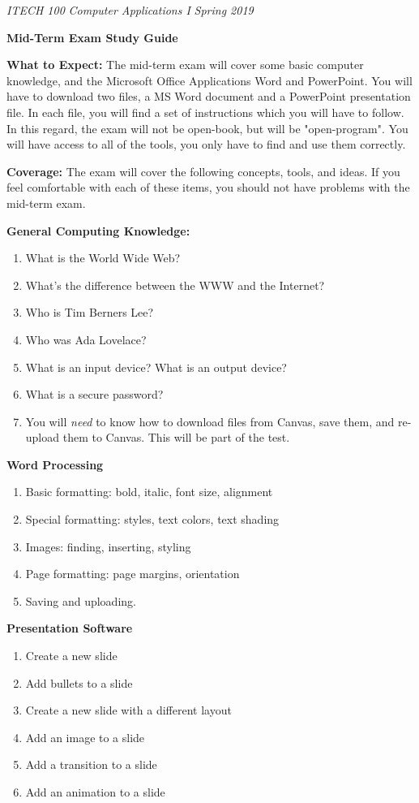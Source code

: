 \documentclass[a4paper, 11pt]{article}
\begin{document}
\noindent
\textit{ITECH 100} \hfill \textit{Computer Applications I} \hfill \textit{Spring 2019}
\begin{center}
\large\textbf{Mid-Term Exam Study Guide}
\end{center}

\large\textbf{What to Expect:}
The mid-term exam will cover some basic computer knowledge, and the Microsoft Office Applications Word and PowerPoint. You will have to download two files, a MS Word document and a PowerPoint presentation file. In each file, you will find a set of instructions which you will have to follow. In this regard, the exam will not be open-book, but will be "open-program". You will have access to all of the tools, you only have to find and use them correctly.

\large\textbf{Coverage:}
The exam will cover the following concepts, tools, and ideas. If you feel comfortable with each of these items, you should not have problems with the mid-term exam.

\large\textbf{General Computing Knowledge:}
\begin{enumerate}[noitemsep]
    \item What is the World Wide Web?
    \item What's the difference between the WWW and the Internet?
    \item Who is Tim Berners Lee?
    \item Who was Ada Lovelace?
    \item What is an input device? What is an output device?
    \item What is a secure password?
    \item You will \textit{need} to know how to download files from Canvas, save them, and re-upload them to Canvas. This will be part of the test.
\end{enumerate}

\large\textbf{Word Processing}
\begin{enumerate}[noitemsep]
    \item Basic formatting: bold, italic, font size, alignment
    \item Special formatting: styles, text colors, text shading
    \item Images: finding, inserting, styling
    \item Page formatting: page margins, orientation
    \item Saving and uploading.
\end{enumerate}

\large\textbf{Presentation Software}
\begin{enumerate}[noitemsep]
    \item Create a new slide
    \item Add bullets to a slide
    \item Create a new slide with a different layout
    \item Add an image to a slide
    \item Add a transition to a slide
    \item Add an animation to a slide
\end{enumerate}
\end{document}
